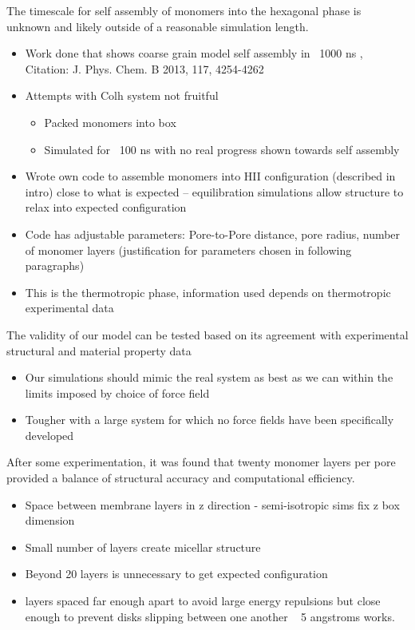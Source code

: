 \documentclass{article}
\begin{document}
	The timescale for self assembly of monomers into the hexagonal phase is unknown and likely outside of a reasonable simulation length. 
	\begin{itemize}
		\item Work done that shows coarse grain model self assembly in ~1000 ns , Citation: J. Phys. Chem. B 2013, 117, 4254-4262
		\item Attempts with Colh system not fruitful  
		\begin{itemize}
			\item Packed monomers into box
			\item Simulated for ~100 ns with no real progress shown towards self assembly
		\end{itemize}  
		\item Wrote own code to assemble monomers into HII configuration (described in intro) close to what is expected -- equilibration simulations allow structure to relax into expected configuration 
		\item Code has adjustable parameters: Pore-to-Pore distance, pore radius, number of monomer layers (justification for parameters chosen in following paragraphs)
		\item This is the thermotropic phase, information used depends on thermotropic experimental data
	\end{itemize}

        The validity of our model can be tested based on its agreement with experimental structural and material property data
        \begin{itemize}
                \item Our simulations should mimic the real system as best as we can within the limits imposed by choice of force field
                \item Tougher with a large system for which no force fields have been specifically developed
	\end{itemize}

	After some experimentation, it was found that twenty monomer layers per pore provided a balance of structural accuracy and computational efficiency. 
	\begin{itemize}
		\item Space between membrane layers in z direction - semi-isotropic sims fix z box dimension
		\item Small number of layers create micellar structure
		\item Beyond 20 layers is unnecessary to get expected configuration
		\item layers spaced far enough apart to avoid large energy repulsions but close enough to prevent disks slipping between one another ~ 5 angstroms works.
	\end{itemize}
	
\end{document}
